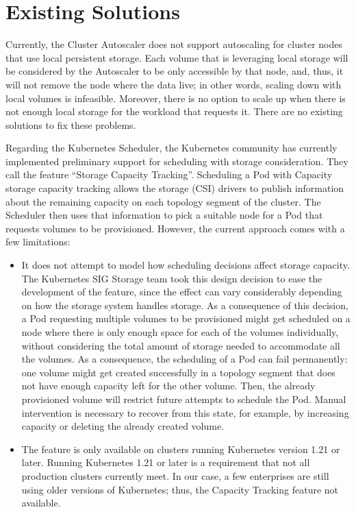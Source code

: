 \section{Existing Solutions} \label{section:intro-existing}

Currently, the Cluster Autoscaler does not support autoscaling for cluster nodes
that use local persistent storage. Each volume that is leveraging local storage
will be considered by the Autoscaler to be only accessible by that node, and,
thus, it will not remove the node where the data live; in other words, scaling
down with local volumes is infeasible. Moreover, there is no option to scale up
when there is not enough local storage for the workload that requests it. There
are no existing solutions to fix these problems.

Regarding the Kubernetes Scheduler, the Kubernetes community has currently
implemented preliminary support for scheduling with storage consideration. They
call the feature ``Storage Capacity Tracking''. Scheduling a Pod with Capacity
storage capacity tracking allows the storage (CSI) drivers to publish
information about the remaining capacity on each topology segment of the
cluster. The Scheduler then uses that information to pick a suitable node for a
Pod that requests volumes to be provisioned. However, the current approach comes
with a few limitations:

\begin{itemize}
      \item It does not attempt to model how scheduling decisions affect storage
            capacity. The Kubernetes SIG Storage team took this design decision
            to ease the development of the feature, since the effect can vary
            considerably depending on how the storage system handles storage. As
            a consequence of this decision, a Pod requesting multiple volumes to
            be provisioned might get scheduled on a node where there is only
            enough space for each of the volumes individually, without
            considering the total amount of storage needed to accommodate all
            the volumes. As a consequence, the scheduling of a Pod can fail
            permanently: one volume might get created successfully in a topology
            segment that does not have enough capacity left for the other
            volume. Then, the already provisioned volume will restrict future
            attempts to schedule the Pod. Manual intervention is necessary to
            recover from this state, for example, by increasing capacity or
            deleting the already created volume.
      \item The feature is only available on clusters running Kubernetes version
            1.21 or later. Running Kubernetes 1.21 or later is a requirement
            that not all production clusters currently meet. In our case, a few
            enterprises are still using older versions of Kubernetes; thus, the
            Capacity Tracking feature not available.
\end{itemize}

